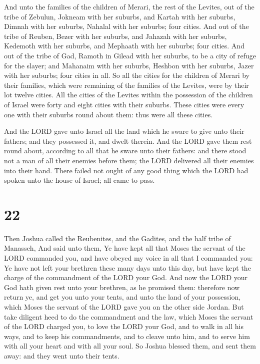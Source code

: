  And unto the families of the children of Merari, the
rest of the Levites, out of the tribe of Zebulun, Jokneam with her
suburbs, and Kartah with her suburbs,  Dimnah with her
suburbs, Nahalal with her suburbs; four cities.  And out of
the tribe of Reuben, Bezer with her suburbs, and Jahazah with her
suburbs,  Kedemoth with her suburbs, and Mephaath with her
suburbs; four cities.  And out of the tribe of Gad, Ramoth
in Gilead with her suburbs, to be a city of refuge for the slayer; and
Mahanaim with her suburbs,  Heshbon with her suburbs, Jazer
with her suburbs; four cities in all.  So all the cities
for the children of Merari by their families, which were remaining of
the families of the Levites, were by their lot twelve cities.
 All the cities of the Levites within the possession of the
children of Israel were forty and eight cities with their suburbs.
 These cities were every one with their suburbs round about
them: thus were all these cities.

 And the LORD gave unto Israel all the land which he
sware to give unto their fathers; and they possessed it, and dwelt
therein.  And the LORD gave them rest round about,
according to all that he sware unto their fathers: and there stood not a
man of all their enemies before them; the LORD delivered all their
enemies into their hand.  There failed not ought of any
good thing which the LORD had spoken unto the house of Israel; all came
to pass.

\hypertarget{section-21}{%
\section{22}\label{section-21}}

 Then Joshua called the Reubenites, and the Gadites, and the
half tribe of Manasseh,  And said unto them, Ye have kept
all that Moses the servant of the LORD commanded you, and have obeyed my
voice in all that I commanded you:  Ye have not left your
brethren these many days unto this day, but have kept the charge of the
commandment of the LORD your God.  And now the LORD your God
hath given rest unto your brethren, as he promised them: therefore now
return ye, and get you unto your tents, and unto the land of your
possession, which Moses the servant of the LORD gave you on the other
side Jordan.  But take diligent heed to do the commandment
and the law, which Moses the servant of the LORD charged you, to love
the LORD your God, and to walk in all his ways, and to keep his
commandments, and to cleave unto him, and to serve him with all your
heart and with all your soul.  So Joshua blessed them, and
sent them away: and they went unto their tents.

